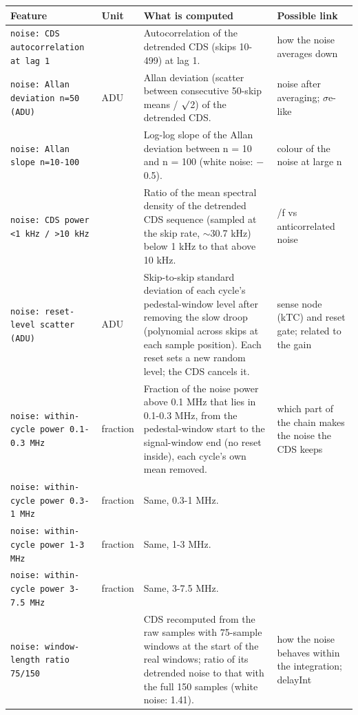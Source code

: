 \documentclass[10pt]{article}
\begin{document}
\begin{longtable}{>{\raggedright\arraybackslash}p{}>{\raggedright\arraybackslash}p{}>{\raggedright\arraybackslash}p{}>{\raggedright\arraybackslash}p{}}
\toprule Feature & Unit & What is computed & Possible link \\ \midrule \endhead
\bottomrule \endfoot
\texttt{noise: CDS autocorrelation at lag 1} &  & Autocorrelation of the detrended CDS (skips 10-499) at lag 1. & how the noise averages down \\
\texttt{noise: Allan deviation n=50 (ADU)} & ADU & Allan deviation (scatter between consecutive 50-skip means / $\surd$2) of the detrended CDS. & noise after averaging; $\sigma$e-like \\
\texttt{noise: Allan slope n=10-100} &  & Log-log slope of the Allan deviation between n = 10 and n = 100 (white noise: $-$0.5). & colour of the noise at large n \\
\texttt{noise: CDS power \textless{}1 kHz / \textgreater{}10 kHz} &  & Ratio of the mean spectral density of the detrended CDS sequence (sampled at the skip rate, $\sim$30.7 kHz) below 1 kHz to that above 10 kHz. & 1/f vs anticorrelated noise \\
\texttt{noise: reset-level scatter (ADU)} & ADU & Skip-to-skip standard deviation of each cycle's pedestal-window level after removing the slow droop (polynomial across skips at each sample position). Each reset sets a new random level; the CDS cancels it. & sense node (kTC) and reset gate; related to the gain \\
\texttt{noise: within-cycle power 0.1-0.3 MHz} & fraction & Fraction of the noise power above 0.1 MHz that lies in 0.1-0.3 MHz, from the pedestal-window start to the signal-window end (no reset inside), each cycle's own mean removed. & which part of the chain makes the noise the CDS keeps \\
\texttt{noise: within-cycle power 0.3-1 MHz} & fraction & Same, 0.3-1 MHz. &  \\
\texttt{noise: within-cycle power 1-3 MHz} & fraction & Same, 1-3 MHz. &  \\
\texttt{noise: within-cycle power 3-7.5 MHz} & fraction & Same, 3-7.5 MHz. &  \\
\texttt{noise: window-length ratio 75/150} &  & CDS recomputed from the raw samples with 75-sample windows at the start of the real windows; ratio of its detrended noise to that with the full 150 samples (white noise: 1.41). & how the noise behaves within the integration; delayInt \\

\end{longtable}
\end{document}
